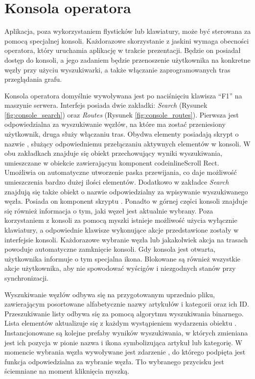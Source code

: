 \section{Konsola operatora}
Aplikacja, poza wykorzystaniem flysticków lub klawiatury, może być sterowana za pomocą specjalnej konsoli. Każdorazowe skorzystanie z jaskini wymaga obecności operatora, który uruchamia aplikację w trakcie prezentacji. Będzie on posiadał dostęp do konsoli, a jego zadaniem będzie przenoszenie użytkownika na konkretne węzły przy użyciu wyszukiwarki, a także włączanie zaprogramowanych tras przeglądania grafu. 

Konsola operatora domyślnie wywoływana jest po naciśnięciu klawisza ``F1'' na maszynie serwera. Interfejs posiada dwie zakładki: \textit{Search} (Rysunek \ref{fig:console_search}) oraz \textit{Routes} (Rysunek \ref{fig:console_routes}). Pierwsza jest odpowiedzialna za wyszukiwanie węzłów, na które ma zostać przeniesiony użytkownik, druga służy włączaniu tras. Obydwa elementy posiadają skrypt o nazwie , służący odpowiedniemu przełączaniu aktywnych elementów w konsoli. W obu zakładkach znajduje się obiekt przechowujący wyniki wyszukiwania, umieszczane w obiekcie zawierającym komponent codeinline{Scroll Rect}. Umożliwia on automatyczne utworzenie paska przewijania, co daje możliwość umieszczenia bardzo dużej ilości elementów. Dodatkowo w zakładce \textit{Search} znajdują się także obiekt o nazwie  odpowiedzialny za wpisywanie wyszukiwanego węzła. Posiada on komponent skryptu . Ponadto w górnej części konsoli znajduje się również informacja o tym, jaki węzeł jest aktualnie wybrany. Poza korzystaniem z konsoli za pomocą myszki istnieje możliwość użycia wyłącznie klawiatury, a odpowiednie klawisze wykonujące akcje przedstawione zostały w interfejsie konsoli. Każdorazowe wybranie węzła lub jakakolwiek akcja na trasach powoduje automatyczne zamknięcie konsoli. Gdy konsola jest otwarta, użytkownika informuje o tym specjalna ikona. Blokowane są również wszystkie akcje użytkownika, aby nie spowodować wyścigów i niezgodnych stanów przy synchronizacji.


Wyszukiwanie węzłów odbywa się na przygotowanym uprzednio pliku, zawierającym posortowane alfabetycznie nazwy artykułów i kategorii oraz ich ID. Przeszukiwanie listy odbywa się za pomocą algorytmu wyszukiwania binarnego. Lista elementów aktualizuje się z każdym wystąpieniem wydarzenia  obiektu . Instancjonowane są kolejne prefaby wyników wyszukiwania, w których zmieniana jest ich pozycja w pionie nazwa i ikona symbolizująca artykuł lub kategorię. W momencie wybrania węzła wywoływane jest zdarzenie , do którego podpięta jest funkcja  odpowiedzialna za wybranie węzła. Tło wybranego przycisku jest ściemniane na moment kliknięcia myszką.

